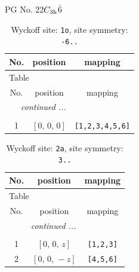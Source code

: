 \documentclass[fleqn,8pt]{jsarticle}
\begin{document}
\setcounter{MaxMatrixCols}{32}

\renewcommand{\tablename}{Table~}
\renewcommand{\figurename}{Figure~}
\begin{center}
\LARGE
PG No. 22\quad$C_{\rm 3h}$\quad$\bar{6}$\quad[ hexagonal ]
\end{center}
\renewcommand{\arraystretch}{1.2}
\begin{longtable}{ccc}
\caption{Wyckoff site: {\tt 1o}, site symmetry: {\tt -6..}}
 \\
 \hline \hline
No. & position & mapping \\ \hline \endfirsthead

\multicolumn{2}{l}{\tablename\ \thetable{}} \\
 \hline \hline
No. & position & mapping \\ \hline \endhead

 \hline \hline
\multicolumn{2}{r}{\footnotesize\it continued ...} \\ \endfoot

 \hline \hline
\multicolumn{2}{r}{} \\ \endlastfoot

1 & $\left[ 0,\, 0,\, 0 \right]$ & {\tt [1,2,3,4,5,6]} \\
\end{longtable}
\renewcommand{\arraystretch}{1.2}
\begin{longtable}{ccc}
\caption{Wyckoff site: {\tt 2a}, site symmetry: {\tt 3..}}
 \\
 \hline \hline
No. & position & mapping \\ \hline \endfirsthead

\multicolumn{2}{l}{\tablename\ \thetable{}} \\
 \hline \hline
No. & position & mapping \\ \hline \endhead

 \hline \hline
\multicolumn{2}{r}{\footnotesize\it continued ...} \\ \endfoot

 \hline \hline
\multicolumn{2}{r}{} \\ \endlastfoot

1 & $\left[ 0,\, 0,\, z \right]$ & {\tt [1,2,3]} \\ \hline
2 & $\left[ 0,\, 0,\, - z \right]$ & {\tt [4,5,6]} \\
\end{longtable}
\renewcommand{\arraystretch}{1.2}
\end{document}

